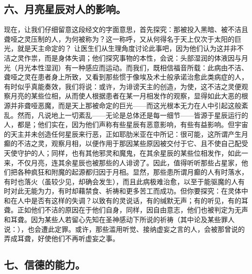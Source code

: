
\subsection{六、月亮星辰对人的影响。}

现在，让我们仔细留意这段经文的字面意思，首先探究：那被投入黑暗、被不洁且聋哑之灵压制的人，为何被称为？这一称呼，又从何得名于天上仅次于太阳的巨光，就是天主命定的？ 让医生们从生理角度讨论此事吧，因为他们认为这并非不洁之灵作祟，而是身体失调；他们探究事物的本性，会说：头部湿润的体液因与月光（月光本性湿润）有一种感应而运动。而我们，既相信福音所载：此病由不洁、聋哑之灵在患者身上所致，又看到那些惯于像埃及术士般承诺治愈此类病症的人，有时似乎真能奏效，我们将说：或许，为诽谤天主的创造，为使，这不洁之灵便观察月亮的某些位相，从而使人根据患者在某一月相发作的观察，显得如此大恶的根源并非聋哑恶魔，而是天上那被命定的巨光——而这光根本无力在人中引起这般紊乱。然而，凡说地上一切紊乱——无论是总体还是每一细节——皆源于星辰运行的人，都是；他们实在，因为他们声称有些星辰有恶意影响，有些有益影响。但宇宙的天主并未创造任何星辰来行恶，正如耶肋米亚在中所记：很可能，这所谓产生月癫的不洁之灵，观察月相，以便作用于那因某些原因被交付于它、且不使自己配受天使守护的人；同样，也有其他邪灵和魔鬼，在其余星辰的某些位相发作，如此一来，不仅月亮，连其余星辰也被那些的人诽谤了。因此，值得听听那些占星家，他们把各种疯狂和附魔的起源都归因于月相。显然，那些患所谓月癫的人有时落水，有时也落火（虽较少见，却确会发生），而且此病极难治愈，以至于能驱魔的人有时对此无能为力，有时却藉禁食、祈祷和更多苦工而成功。但你要探究：在灵体中和在人中是否有这样的失调？以致有的灵说话，有的缄默无声；有的听见，有的耳聋。正如他们不洁的原因在于他们自身，同样，因自由意志，他们也被判定为无声和耳聋。因为某些人若留心先知在圣神感动下所说的祈祷（其中论及某些罪人说：），也会遭此定罪。或许，那些滥用听觉、接纳虚妄之言的人，会被那曾说的 弄成耳聋，好使他们不再听虚妄之事。\par


\subsection{七、信德的能力。}

